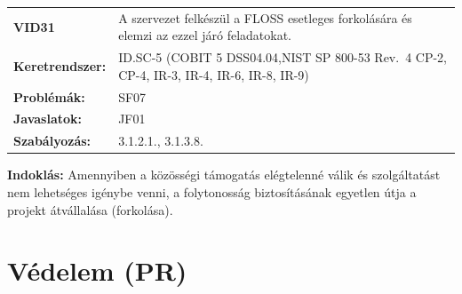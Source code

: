 \documentclass[12pt,magyar,a4paper,oneside]{scrreprt}
\begin{document}
\begin{longtable}[]{@{}ll@{}}
\toprule
\endhead
\begin{minipage}[t]{0.16\columnwidth}\raggedright
\textbf{VID31}\strut
\end{minipage} & \begin{minipage}[t]{0.79\columnwidth}\raggedright
A szervezet felkészül a FLOSS esetleges forkolására és elemzi az ezzel
járó feladatokat.\strut
\end{minipage}\tabularnewline
\begin{minipage}[t]{0.16\columnwidth}\raggedright
\textbf{Keretrendszer:}\strut
\end{minipage} & \begin{minipage}[t]{0.79\columnwidth}\raggedright
ID.SC-5 (COBIT 5 DSS04.04,NIST SP 800-53 Rev.~4 CP-2, CP-4, IR-3, IR-4,
IR-6, IR-8, IR-9)\strut
\end{minipage}\tabularnewline
\begin{minipage}[t]{0.16\columnwidth}\raggedright
\textbf{Problémák:}\strut
\end{minipage} & \begin{minipage}[t]{0.79\columnwidth}\raggedright
SF07\strut
\end{minipage}\tabularnewline
\begin{minipage}[t]{0.16\columnwidth}\raggedright
\textbf{Javaslatok:}\strut
\end{minipage} & \begin{minipage}[t]{0.79\columnwidth}\raggedright
JF01\strut
\end{minipage}\tabularnewline
\begin{minipage}[t]{0.16\columnwidth}\raggedright
\textbf{Szabályozás:}\strut
\end{minipage} & \begin{minipage}[t]{0.79\columnwidth}\raggedright
3.1.2.1., 3.1.3.8.\strut
\end{minipage}\tabularnewline
\bottomrule
\end{longtable}

\textbf{Indoklás: } Amennyiben a közösségi támogatás elégtelenné válik
és szolgáltatást nem lehetséges igénybe venni, a folytonosság
biztosításának egyetlen útja a projekt átvállalása (forkolása).

\hypertarget{vuxe9delem-pr}{%
\section{Védelem (PR)}\label{vuxe9delem-pr}}
\end{document}
